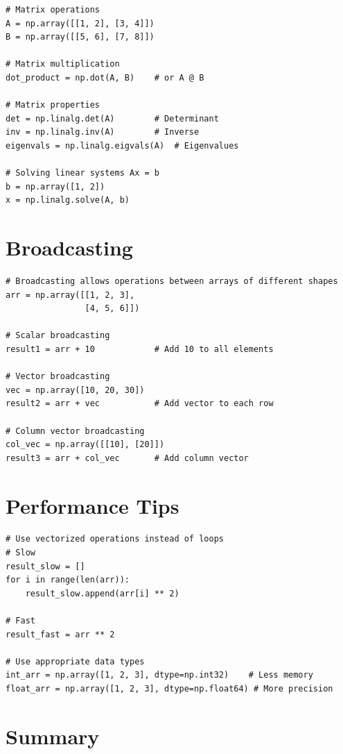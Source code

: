 \documentclass[12pt,a4paper]{article}
\begin{document}
\begin{lstlisting}
# Matrix operations
A = np.array([[1, 2], [3, 4]])
B = np.array([[5, 6], [7, 8]])

# Matrix multiplication
dot_product = np.dot(A, B)    # or A @ B

# Matrix properties
det = np.linalg.det(A)        # Determinant
inv = np.linalg.inv(A)        # Inverse
eigenvals = np.linalg.eigvals(A)  # Eigenvalues

# Solving linear systems Ax = b
b = np.array([1, 2])
x = np.linalg.solve(A, b)
\end{lstlisting}

\section{Broadcasting}

\begin{lstlisting}
# Broadcasting allows operations between arrays of different shapes
arr = np.array([[1, 2, 3],
                [4, 5, 6]])

# Scalar broadcasting
result1 = arr + 10            # Add 10 to all elements

# Vector broadcasting
vec = np.array([10, 20, 30])
result2 = arr + vec           # Add vector to each row

# Column vector broadcasting
col_vec = np.array([[10], [20]])
result3 = arr + col_vec       # Add column vector
\end{lstlisting}

\section{Performance Tips}

\begin{lstlisting}
# Use vectorized operations instead of loops
# Slow
result_slow = []
for i in range(len(arr)):
    result_slow.append(arr[i] ** 2)

# Fast
result_fast = arr ** 2

# Use appropriate data types
int_arr = np.array([1, 2, 3], dtype=np.int32)    # Less memory
float_arr = np.array([1, 2, 3], dtype=np.float64) # More precision
\end{lstlisting}

\section{Summary}
\end{document}
